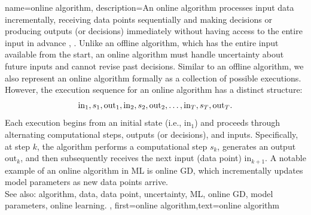 {name={online algorithm},
	description={An online algorithm processes input data incrementally, 
		receiving data points sequentially and making decisions or producing outputs (or decisions) immediately 
		without having access to the entire input in advance \cite{PredictionLearningGames}, \cite{HazanOCO}. 
		Unlike an offline algorithm, which has the entire input available from the start, an online algorithm 
		must handle uncertainty about future inputs and cannot revise past decisions. Similar to an 
		offline algorithm, we also represent an online algorithm formally as a collection of possible 
		executions. However, the execution sequence for an online algorithm has a distinct structure:
		$${\rm in}_{1},s_1,{\rm out}_{1},{\rm in}_{2},s_2,{\rm out}_{2},\ldots,{\rm in}_{T},s_T,{\rm out}_{T}.$$ 
		Each execution begins from an initial state (i.e., \(\text{in}_{1}\)) and proceeds through alternating 
		computational steps, outputs (or decisions), and inputs. Specifically, at step \(k\), 
		the algorithm performs a computational step \(s_{k}\), generates an output \(\text{out}_{k}\), 
		and then subsequently receives the next input (data point) \(\text{in}_{k+1}\). A 
		notable example of an online algorithm in ML is online GD, which incrementally 
		updates model parameters as new data points arrive. 
					\\ 
		See also: algorithm, data, data point, uncertainty, ML, online GD, model parameters, online learning.
	},
	first={online algorithm},text={online algorithm} 
}



















